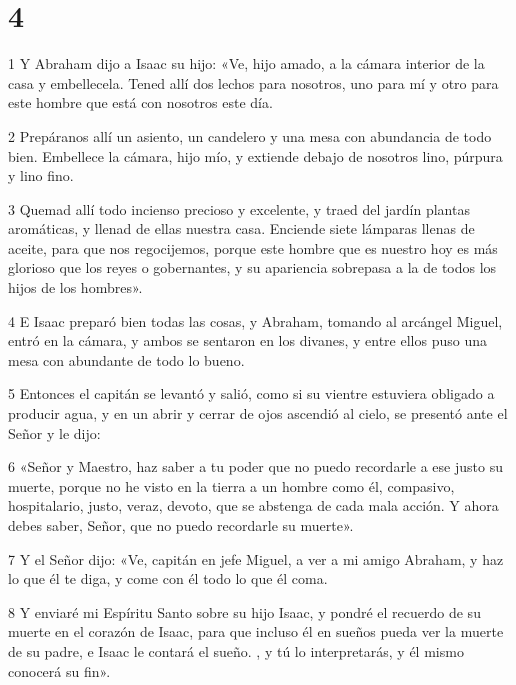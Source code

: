 \chapter{4}

\par 1 Y Abraham dijo a Isaac su hijo: «Ve, hijo amado, a la cámara interior de la casa y embellecela. Tened allí dos lechos para nosotros, uno para mí y otro para este hombre que está con nosotros este día.

\par 2 Prepáranos allí un asiento, un candelero y una mesa con abundancia de todo bien. Embellece la cámara, hijo mío, y extiende debajo de nosotros lino, púrpura y lino fino.

\par 3 Quemad allí todo incienso precioso y excelente, y traed del jardín plantas aromáticas, y llenad de ellas nuestra casa. Enciende siete lámparas llenas de aceite, para que nos regocijemos, porque este hombre que es nuestro hoy es más glorioso que los reyes o gobernantes, y su apariencia sobrepasa a la de todos los hijos de los hombres».

\par 4 E Isaac preparó bien todas las cosas, y Abraham, tomando al arcángel Miguel, entró en la cámara, y ambos se sentaron en los divanes, y entre ellos puso una mesa con abundante de todo lo bueno.

\par 5 Entonces el capitán se levantó y salió, como si su vientre estuviera obligado a producir agua, y en un abrir y cerrar de ojos ascendió al cielo, se presentó ante el Señor y le dijo:

\par 6 «Señor y Maestro, haz saber a tu poder que no puedo recordarle a ese justo su muerte, porque no he visto en la tierra a un hombre como él, compasivo, hospitalario, justo, veraz, devoto, que se abstenga de cada mala acción. Y ahora debes saber, Señor, que no puedo recordarle su muerte».

\par 7 Y el Señor dijo: «Ve, capitán en jefe Miguel, a ver a mi amigo Abraham, y haz lo que él te diga, y come con él todo lo que él coma.

\par 8 Y enviaré mi Espíritu Santo sobre su hijo Isaac, y pondré el recuerdo de su muerte en el corazón de Isaac, para que incluso él en sueños pueda ver la muerte de su padre, e Isaac le contará el sueño. , y tú lo interpretarás, y él mismo conocerá su fin».


